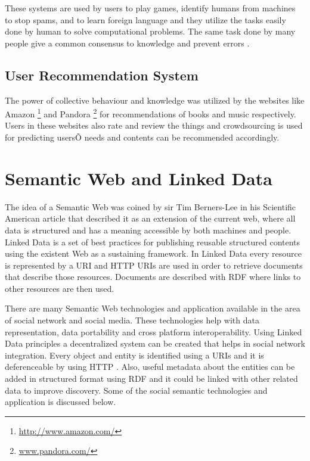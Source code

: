 These systems are used by users to play games, identify humans from machines to stop spams, and to learn foreign language and they utilize the tasks easily done by human to solve computational problems. The same task done by many people give a common consensus to knowledge and prevent errors \cite{von2009human}.


\subsection{User Recommendation System}

The power of collective behaviour and knowledge was utilized by the websites like Amazon \footnote{\url{http://www.amazon.com/}} and Pandora \footnote{\url{www.pandora.com/}} for recommendations of books and music respectively. Users in these websites also rate and review the things and crowdsourcing is used for predicting usersÕ needs and contents can be recommended accordingly.


\section{Semantic Web and Linked Data}

The idea of a Semantic Web was coined by sir Tim Berners-Lee in his Scientific American article \cite{berners2001semantic} that described it as an extension of the current web, where all data is structured and has a meaning accessible by both machines and people. Linked Data is a set of best practices for publishing reusable structured contents using the existent Web as a sustaining framework. In Linked Data every resource is represented by a URI and HTTP URIs are used in order to retrieve documents that describe those resources. Documents are described with RDF where links to other resources are then used.

There are many Semantic Web technologies and application available in the area of social network and social media. These technologies help with data representation, data portability and cross platform interoperability. Using Linked Data principles a decentralized system can be created that helps in social network integration. Every object and entity is identified using a URIs and it is deferenceable by using HTTP \cite{shadbolt2006semantic}. Also, useful metadata about the entities can be added in structured format using RDF and it could be linked with other related data to improve discovery. Some of the social semantic technologies and application is discussed below.

